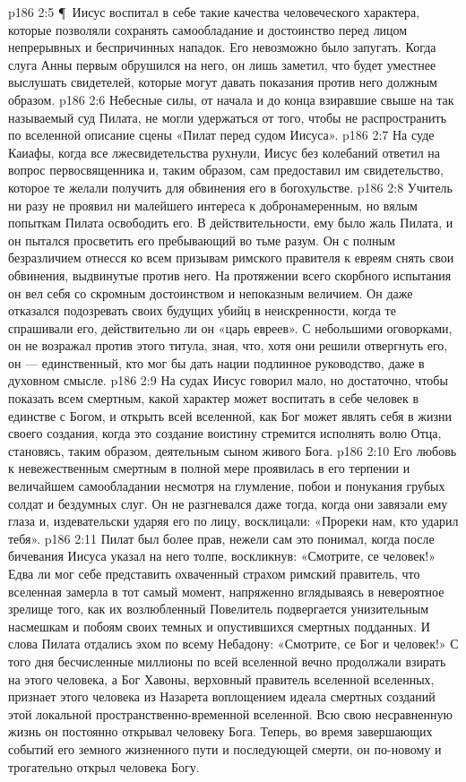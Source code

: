 \vs p186 2:5 \P\ Иисус воспитал в себе такие качества человеческого характера, которые позволяли сохранять самообладание и достоинство перед лицом непрерывных и беспричинных нападок. Его невозможно было запугать. Когда слуга Анны первым обрушился на него, он лишь заметил, что будет уместнее выслушать свидетелей, которые могут давать показания против него должным образом.
\vs p186 2:6 Небесные силы, от начала и до конца взиравшие свыше на так называемый суд Пилата, не могли удержаться от того, чтобы не распространить по вселенной описание сцены «Пилат перед судом Иисуса».
\vs p186 2:7 На суде Каиафы, когда все лжесвидетельства рухнули, Иисус без колебаний ответил на вопрос первосвященника и, таким образом, сам предоставил им свидетельство, которое те желали получить для обвинения его в богохульстве.
\vs p186 2:8 Учитель ни разу не проявил ни малейшего интереса к добронамеренным, но вялым попыткам Пилата освободить его. В действительности, ему было жаль Пилата, и он пытался просветить его пребывающий во тьме разум. Он с полным безразличием отнесся ко всем призывам римского правителя к евреям снять свои обвинения, выдвинутые против него. На протяжении всего скорбного испытания он вел себя со скромным достоинством и непоказным величием. Он даже отказался подозревать своих будущих убийц в неискренности, когда те спрашивали его, действительно ли он «царь евреев». С небольшими оговорками, он не возражал против этого титула, зная, что, хотя они решили отвергнуть его, он --- единственный, кто мог бы дать нации подлинное руководство, даже в духовном смысле.
\vs p186 2:9 На судах Иисус говорил мало, но достаточно, чтобы показать всем смертным, какой характер может воспитать в себе человек в единстве с Богом, и открыть всей вселенной, как Бог может являть себя в жизни своего создания, когда это создание воистину стремится исполнять волю Отца, становясь, таким образом, деятельным сыном живого Бога.
\vs p186 2:10 Его любовь к невежественным смертным в полной мере проявилась в его терпении и величайшем самообладании несмотря на глумление, побои и понукания грубых солдат и бездумных слуг. Он не разгневался даже тогда, когда они завязали ему глаза и, издевательски ударяя его по лицу, восклицали: «Прореки нам, кто ударил тебя».
\vs p186 2:11 Пилат был более прав, нежели сам это понимал, когда после бичевания Иисуса указал на него толпе, воскликнув: «Смотрите, се человек!» Едва ли мог себе представить охваченный страхом римский правитель, что вселенная замерла в тот самый момент, напряженно вглядываясь в невероятное зрелище того, как их возлюбленный Повелитель подвергается унизительным насмешкам и побоям своих темных и опустившихся смертных подданных. И слова Пилата отдались эхом по всему Небадону: «Смотрите, се Бог и человек!» С того дня бесчисленные миллионы по всей вселенной вечно продолжали взирать на этого человека, а Бог Хавоны, верховный правитель вселенной вселенных, признает этого человека из Назарета воплощением идеала смертных созданий этой локальной пространственно\hyp{}временной вселенной. Всю свою несравненную жизнь он постоянно открывал человеку Бога. Теперь, во время завершающих событий его земного жизненного пути и последующей смерти, он по\hyp{}новому и трогательно открыл человека Богу.

